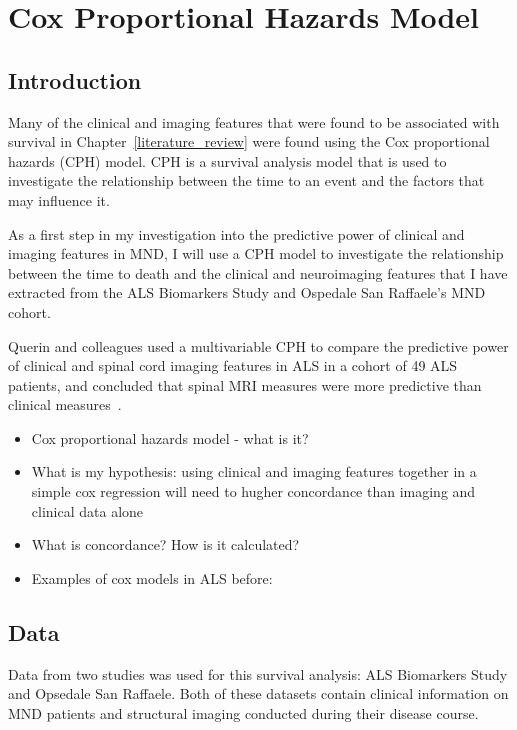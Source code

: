 \chapter{Cox Proportional Hazards Model}
\label{cox_proportional_hazards_model}

\section{Introduction}

Many of the clinical and imaging features that were found to be associated with survival in Chapter~\ref{literature_review} were found using the Cox proportional hazards (CPH) model.
CPH is a survival analysis model that is used to investigate the relationship between the time to an event and the factors that may influence it.

As a first step in my investigation into the predictive power of clinical and imaging features in MND, I will use a CPH model to investigate the relationship between the time to death and the clinical and neuroimaging features that I have extracted from the ALS Biomarkers Study and Ospedale San Raffaele's MND cohort.

Querin and colleagues used a multivariable CPH to compare the predictive power of clinical and spinal cord imaging features in ALS in a cohort of 49 ALS patients, and concluded that spinal MRI measures were more predictive than clinical measures~\cite{querinSpinalCordMultiparametric2017}.

\begin{itemize}
    \item Cox proportional hazards model - what is it?
    \item What is my hypothesis: using clinical and imaging features together in a simple cox regression will need to hugher concordance than imaging and clinical data alone
    \item What is concordance? How is it calculated?
    \item Examples of cox models in ALS before:
\end{itemize}

\section{Data}

Data from two studies was used for this survival analysis: ALS Biomarkers Study and Opsedale San Raffaele.
Both of these datasets contain clinical information on MND patients and structural imaging conducted during their disease course.

